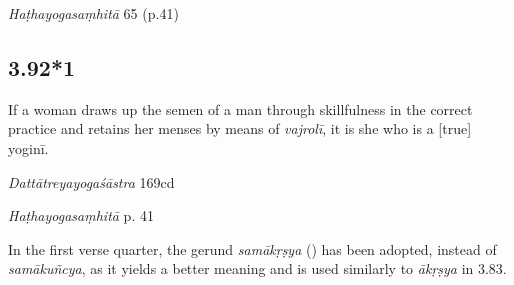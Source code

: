 \begin{ekdosis}
\begin{testimonia}[hp03_092]
\emph{Haṭhayogasaṃhitā} 65 (p.41)
\begin{versinnote}
\end{versinnote}
\end{testimonia}



\subsection*{3.92*1}
\begin{translation}[hp03_092_1]
If a woman draws up the semen of a man through skillfulness in the correct practice and retains her menses by means of \emph{vajrolī}, it is she who is a [true] yoginī.
\end{translation}

\begin{sources}[hp03_092_1]
\emph{Dattātreyayogaśāstra} 169cd
\begin{versinnote}
\end{versinnote}
\end{sources}

\begin{testimonia}[hp03_092_1]
\emph{Haṭhayogasaṃhitā} p. 41
\begin{versinnote}
\end{versinnote}
\end{testimonia}

\begin{philcomm}[hp03_092_1]
In the first verse quarter, the gerund \emph{samākṛṣya} (\textgamma) has been adopted, instead of \emph{samākuñcya}, as it yields a better meaning and is used similarly to \emph{ākṛṣya} in 3.83.


\end{philcomm}
\end{ekdosis}

